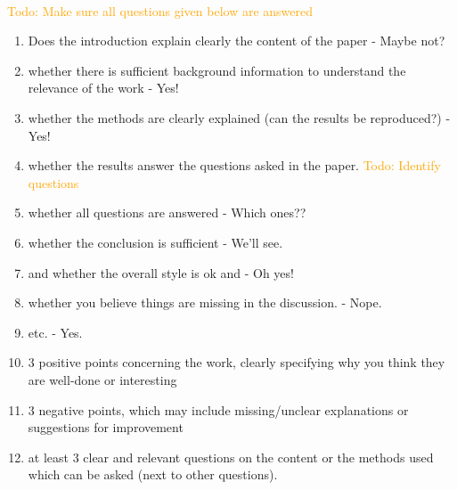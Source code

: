 \documentclass[letterpaper]{article}
\newcommand\todo[1]{\textcolor{orange}{Todo: #1}}
\begin{document}
\\\todo{Make sure all questions given below are answered}
\begin{enumerate}
 \item Does the introduction explain clearly the content of the paper - Maybe not?
 \item whether there is sufficient background information to understand the relevance of the work - Yes!
 \item whether the methods are clearly explained (can the results be reproduced?) - Yes!
 \item whether the results answer the questions asked in the paper. \todo{Identify questions}
 \item whether all questions are answered - Which ones??
 \item whether the conclusion is sufficient - We'll see.
 \item and whether the overall style is ok and - Oh yes!
 \item whether you believe things are missing in the discussion. - Nope.
 \item etc. - Yes.
 \item 3 positive points concerning the work, clearly specifying why you think they are well-done or interesting
 \item 3 negative points, which may include missing/unclear explanations or suggestions for improvement
 \item at least 3 clear and relevant questions on the content or the methods used which can be asked (next to other questions).
\end{enumerate}

\footnotesize


\end{document}

